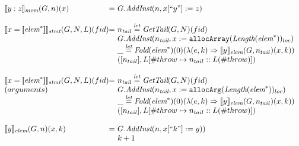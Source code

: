 \[\begin{array}{l@{}l@{~}l}
\transfun{\ircfgfield{y}{z}}_{\emph{mem}}(G,n)(x) & = &
	G.\emph{AddInst}(n,x[``y"] := z)\\%
	& & \\

\transfun{\irarray{x}{\emph{elem}^*}}_{\emph{stmt}}(G,N,L)(fid) & = &
	n_{\emph{tail}} \letval \GetTail(G,N)(fid)\\
	& & G.\emph{AddInst}(n_{\emph{tail}},x :=\TT{allocArray}(\Length(\emph{elem}^*))_{loc})\\
	& & \_ \letval \Fold(\emph{elem}^*)(0)(\lambda(e,k)\Rightarrow\transfun{y}_{\emph{elem}}(G,n_{tail})(x,k))\\
	& & ([n_{tail}],L[\#throw \mapsto n_{tail}::L(\#throw)])\\
	& & \\

\transfun{\irarray{x}{\emph{elem}^*}}_{\emph{stmt}}(G,N,L)(fid) & = &
	n_{\emph{tail}} \letval \GetTail(G,N)(fid)\\
(arguments) & & G.\emph{AddInst}(n_{\emph{tail}},x :=\TT{allocArg}(\Length(\emph{elem}^*))_{loc})\\
	& & \_ \letval \Fold(\emph{elem}^*)(0)(\lambda(e,k)\Rightarrow\transfun{y}_{\emph{elem}}(G,n_{tail})(x,k))\\
	& & ([n_{tail}],L[\#throw \mapsto n_{tail}::L(\#throw)])\\
	& & \\

\transfun{y}_{\emph{elem}}(G,n)(x,k) & = &
	G.\emph{AddInst}(n,x[``k"] := y))\\%
	& & k+1\\
	& & \\
\end{array}
\]

